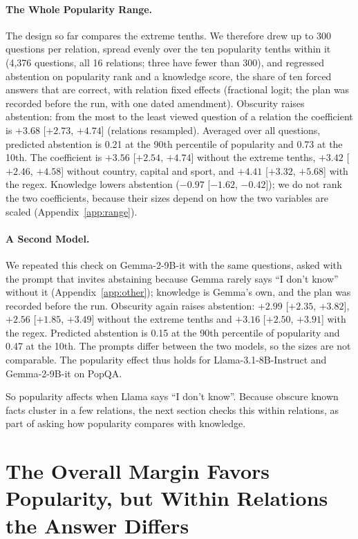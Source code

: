 \documentclass[letterpaper]{article} %
\newcommand{\idk}{``I don't know''}
\begin{document}
\paragraph{The Whole Popularity Range.}
The design so far compares the extreme tenths. We therefore drew up to 300 questions per relation, spread evenly over the ten popularity tenths within it (4,376 questions, all 16 relations; three have fewer than 300), and regressed abstention on popularity rank and a knowledge score, the share of ten forced answers that are correct, with relation fixed effects (fractional logit; the plan was recorded before the run, with one dated amendment). Obscurity raises abstention: from the most to the least viewed question of a relation the coefficient is $+3.68$ [$+2.73$, $+4.74$] (relations resampled). Averaged over all questions, predicted abstention is 0.21 at the 90th percentile of popularity and 0.73 at the 10th. The coefficient is $+3.56$ [$+2.54$, $+4.74$] without the extreme tenths, $+3.42$ [$+2.46$, $+4.58$] without country, capital and sport, and $+4.41$ [$+3.32$, $+5.68$] with the regex. Knowledge lowers abstention ($-0.97$ [$-1.62$, $-0.42$]); we do not rank the two coefficients, because their sizes depend on how the two variables are scaled (Appendix~\ref{app:range}).

\paragraph{A Second Model.}
We repeated this check on Gemma-2-9B-it with the same questions, asked with the prompt that invites abstaining because Gemma rarely says \idk{} without it (Appendix~\ref{app:other}); knowledge is Gemma's own, and the plan was recorded before the run. Obscurity again raises abstention: $+2.99$ [$+2.35$, $+3.82$], $+2.56$ [$+1.85$, $+3.49$] without the extreme tenths and $+3.16$ [$+2.50$, $+3.91$] with the regex. Predicted abstention is 0.15 at the 90th percentile of popularity and 0.47 at the 10th. The prompts differ between the two models, so the sizes are not comparable. The popularity effect thus holds for Llama-3.1-8B-Instruct and Gemma-2-9B-it on PopQA.

So popularity affects when Llama says \idk. Because obscure known facts cluster in a few relations, the next section checks this within relations, as part of asking how popularity compares with knowledge.

\section{The Overall Margin Favors Popularity, but Within Relations the Answer Differs}
\label{sec:margin}
\end{document}
